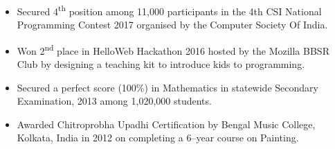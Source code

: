 \documentclass[a4paper,10pt]{article}
\begin{document}
\begin{itemize}
\item {Secured 4\textsuperscript{th} position among 11,000 participants in the 4th CSI National Programming Contest 2017 organised by the Computer Society Of India.}\\[-0.5cm]
\item {Won 2\textsuperscript{nd} place in HelloWeb Hackathon 2016 hosted by the Mozilla BBSR Club by designing a teaching kit to introduce kids to programming.}\\[-0.5cm]
\item {Secured a perfect score (100\%) in Mathematics in statewide Secondary Examination, 2013 among 1,020,000 students.}\\[-0.5cm]
\item {Awarded Chitroprobha Upadhi Certification by Bengal Music College, Kolkata, India in 2012 on completing a 6--year course on Painting.}\\[-0.5cm]
\end{itemize}
\end{document}

